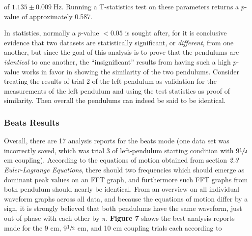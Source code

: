 \documentclass[12pt]{article}
\newcommand{\Hz}{\;\mathrm{Hz}}
\begin{document}
\begin{multicols}{2}
\noindent
of $1.135\pm0.009\Hz$.
Running a T-statistics test on these parameters returns a $p$-value of approximately 0.587. 

In statistics, normally a $p$-value $<0.05$ is sought after, 
for it is conclusive evidence that two datasets are statistically significant, or \textit{different}, from one another,
but since the goal of this analysis is to prove that the pendulums are \textit{identical} to one another,
the ``insignificant'' results from having such a high $p$-value works in favor in showing the similarity of the two pendulums.
Consider treating the results of trial 2 of the left pendulum as validation for the measurements of the left pendulum and using the test statistics as proof of similarity.
Then overall the pendulums can indeed be said to be identical.
\vfill

\subsubsection{Beats Results}
Overall, there are 17 analysis reports for the beats mode (one data set was incorrectly saved, which was trial 3 of left-pendulum starting condition with 9$\sfrac{1}{2}$ cm coupling).
According to the equations of motion obtained from section \textit{2.3 Euler-Lagrange Equations},
there should two frequencies which should emerge as dominant peak values on an FFT graph, and furthermore such FFT graphs from both pendulum should nearly be identical.
From an overview on all individual waveform graphs across all data, and because the equations of motion differ by a sign, 
it is strongly believed that both pendulums have the same waveform, just out of phase with each other by $\pi$. 
\textbf{Figure 7} shows the best analysis reports made for the 9 cm, 9$\sfrac{1}{2}$ cm, and 10 cm coupling trials each according to
\end{multicols}
\newpage
\end{document}
